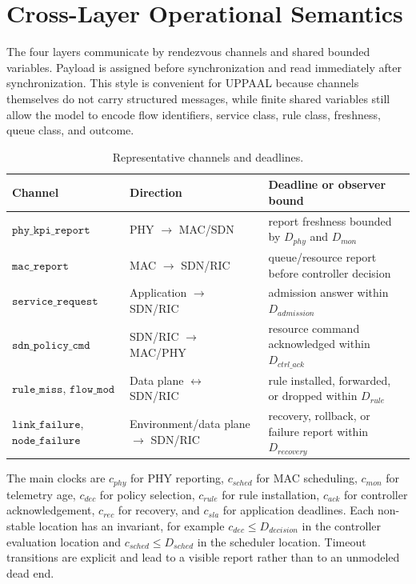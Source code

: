 \documentclass[runningheads]{llncs}
\newcommand{\code}[1]{\texttt{#1}}
\begin{document}
\section{Cross-Layer Operational Semantics}

The four layers communicate by rendezvous channels and shared bounded variables. Payload is assigned before synchronization and read immediately after synchronization. This style is convenient for UPPAAL because channels themselves do not carry structured messages, while finite shared variables still allow the model to encode flow identifiers, service class, rule class, freshness, queue class, and outcome.

\begin{table}[t]
\caption{Representative channels and deadlines.}
\label{tab:channels}
\centering
\small
\begin{tabular}{|p{}|p{}|p{}|}
\hline
\textbf{Channel} & \textbf{Direction} & \textbf{Deadline or observer bound}\\
\hline
$\code{phy\_kpi\_report}$ & PHY $\rightarrow$ MAC/SDN & report freshness bounded by $D_{phy}$ and $D_{mon}$\\
\hline
$\code{mac\_report}$ & MAC $\rightarrow$ SDN/RIC & queue/resource report before controller decision\\
\hline
$\code{service\_request}$ & Application $\rightarrow$ SDN/RIC & admission answer within $D_{admission}$\\
\hline
$\code{sdn\_policy\_cmd}$ & SDN/RIC $\rightarrow$ MAC/PHY & resource command acknowledged within $D_{ctrl\_ack}$\\
\hline
$\code{rule\_miss}$, $\code{flow\_mod}$ & Data plane $\leftrightarrow$ SDN/RIC & rule installed, forwarded, or dropped within $D_{rule}$\\
\hline
$\code{link\_failure}$, $\code{node\_failure}$ & Environment/data plane $\rightarrow$ SDN/RIC & recovery, rollback, or failure report within $D_{recovery}$\\
\hline
\end{tabular}
\end{table}

The main clocks are $c_{phy}$ for PHY reporting, $c_{sched}$ for MAC scheduling, $c_{mon}$ for telemetry age, $c_{dec}$ for policy selection, $c_{rule}$ for rule installation, $c_{ack}$ for controller acknowledgement, $c_{rec}$ for recovery, and $c_{sla}$ for application deadlines. Each non-stable location has an invariant, for example $c_{dec}\le D_{decision}$ in the controller evaluation location and $c_{sched}\le D_{sched}$ in the scheduler location. Timeout transitions are explicit and lead to a visible report rather than to an unmodeled dead end.
\end{document}
